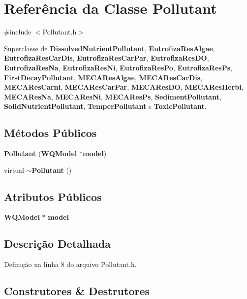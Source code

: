 \section{Referência da Classe Pollutant}
\label{class_pollutant}


{\ttfamily \#include $<$Pollutant.\+h$>$}



Superclasse de {\bf Dissolved\+Nutrient\+Pollutant}, {\bf Eutrofiza\+Res\+Algae}, {\bf Eutrofiza\+Res\+Car\+Dis}, {\bf Eutrofiza\+Res\+Car\+Par}, {\bf Eutrofiza\+Res\+DO}, {\bf Eutrofiza\+Res\+Na}, {\bf Eutrofiza\+Res\+Ni}, {\bf Eutrofiza\+Res\+Po}, {\bf Eutrofiza\+Res\+Ps}, {\bf First\+Decay\+Pollutant}, {\bf M\+E\+C\+A\+Res\+Algae}, {\bf M\+E\+C\+A\+Res\+Car\+Dis}, {\bf M\+E\+C\+A\+Res\+Carni}, {\bf M\+E\+C\+A\+Res\+Car\+Par}, {\bf M\+E\+C\+A\+Res\+DO}, {\bf M\+E\+C\+A\+Res\+Herbi}, {\bf M\+E\+C\+A\+Res\+Na}, {\bf M\+E\+C\+A\+Res\+Ni}, {\bf M\+E\+C\+A\+Res\+Ps}, {\bf Sediment\+Pollutant}, {\bf Solid\+Nutrient\+Pollutant}, {\bf Temper\+Pollutant} e {\bf Toxic\+Pollutant}.

\subsection*{Métodos Públicos}
\begin{DoxyCompactItemize}
\item 
{\bf Pollutant} ({\bf W\+Q\+Model} $\ast${\bf model})
\item 
virtual {\bf $\sim$\+Pollutant} ()
\end{DoxyCompactItemize}
\subsection*{Atributos Públicos}
\begin{DoxyCompactItemize}
\item 
{\bf W\+Q\+Model} $\ast$ {\bf model}
\end{DoxyCompactItemize}


\subsection{Descrição Detalhada}


Definição na linha 8 do arquivo Pollutant.\+h.



\subsection{Construtores \& Destrutores}
